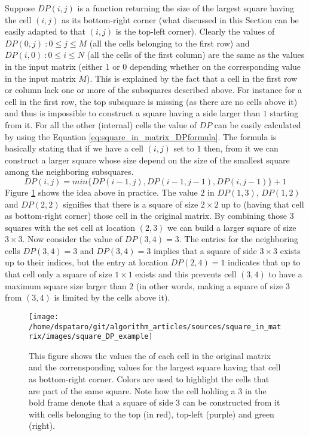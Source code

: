 Suppose $DP(i,j)$ is a function returning the size of the largest square having the cell $(i,j)$ as
its bottom-right corner (what discussed in this Section can be easily adapted to that $(i,j)$ is the
top-left corner). Clearly the values of $DP(0,j) \: : 0 \leq j \leq M$ (all the cells belonging to
the first row) and $DP(i,0) \: : 0 \leq i \leq N$ (all the cells of the first column) are the same
as the values in the input matrix (either 1 or 0 depending whether on the corresponding value in the
input matrix $M$). This is explained by the fact that a cell in the first row or column lack one or
more of the subsquares described above. For instance for a cell in the first row, the top subsquare
is missing (as there are no cells above it) and thus is impossible to construct a square having a
side larger than $1$ starting from it. For all the other (internal) cells the value of $DP$ can be
easily calculated by using the Equation \ref{eq:square_in_matrix_DPformula}. The formula is
basically stating that if we have a cell $(i,j)$ set to $1$ then, from it we can construct a larger
square whose size depend on the size of the smallest square among the neighboring subsquares.
\begin{equation}
	\label{eq:square_in_matrix_DPformula}
	DP(i,j) = min\{DP(i-1,j),DP(i-1,j-1), DP(i,j-1)\} +1
\end{equation}
Figure \ref{fig:square_in_matrix:square_DP_example} shows the idea above in practice. The value $2$
in $DP(1,3)$, $DP(1,2)$ and $DP(2,2)$ signifies that there is a square of size $2\times 2$ up to
(having that cell as bottom-right corner) those cell in the original matrix. By combining those $3$
squares with the set cell at location $(2,3)$ we can build a larger square of size $3\times 3$. Now
consider the value of $DP(3,4)=3$. The entries for the neighboring cells $DP(3,4)=3$ and $DP(3,4)=3$
implies that a square of side $3\times 3$ exists up to their indices, but the entry at location
$DP(2,4)=1$ indicates that up to that cell only a square of size $1\times 1$ exists and this
prevents cell $(3,4)$ to have a maximum square size larger than $2$ (in other words, making a square
of size $3$ from $(3,4)$ is limited by the cells above it).

\begin{figure}
	\centering
	\label{fig:square_in_matrix:square_DP_example}
	\texttt{[image: /home/dspataro/git/algorithm\_articles/sources/square\_in\_matrix/images/square\_DP\_example]}
	\caption{This figure shows the values the of each cell in the original matrix and the
	corrensponding values for the largest square having that cell as bottom-right corner. Colors are
	used to highlight the cells that are part of the same square. Note how the cell holding a $3$ in
	the bold frame denote that a square of side $3$ can be constructed from it with cells belonging
	to the top (in red), top-left (purple) and green (right). }
\end{figure}

